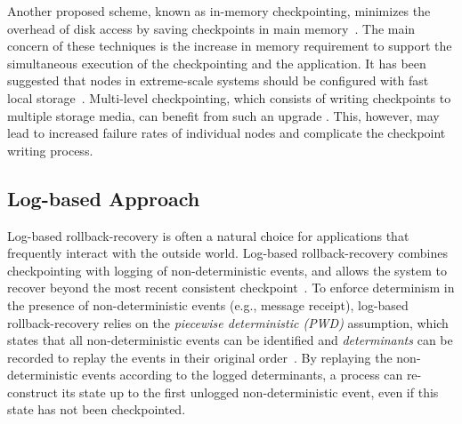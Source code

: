 Another proposed scheme, known as in-memory checkpointing, minimizes the overhead of disk access by saving checkpoints in main memory~\cite{zheng_2004_ftccharm,6264677}.
The main concern of these techniques is the increase in
memory requirement to support the simultaneous execution of the checkpointing and the application. 
It has been suggested that nodes in extreme-scale systems should be configured with fast local storage~\cite{doe_ascr_exascale_2011}. 
Multi-level checkpointing, which consists of
writing checkpoints to multiple storage media, 
can benefit from such an upgrade \cite{Moody:10:SCR}. This,
however, may lead to increased failure rates of individual nodes and complicate the checkpoint writing process.




\subsection{Log-based Approach}
Log-based rollback-recovery is often a
natural choice for applications that frequently
interact with the outside world. 
Log-based rollback-recovery combines checkpointing with logging of non-deterministic events, and allows the system to recover beyond the most recent consistent checkpoint~\cite{strom1985optimistic}.
To enforce determinism in the presence of non-deterministic events (e.g., message receipt), log-based rollback-recovery relies on the \textit{piecewise deterministic (PWD)} assumption, which states that all non-deterministic events can be identified and \textit{determinants} can be recorded to replay the events in their original order~\cite{alvisi1996trade}. By replaying the non-deterministic
events according to the logged determinants, a
process can re-construct its
state up to the first unlogged non-deterministic event, even if this state has not been checkpointed.

